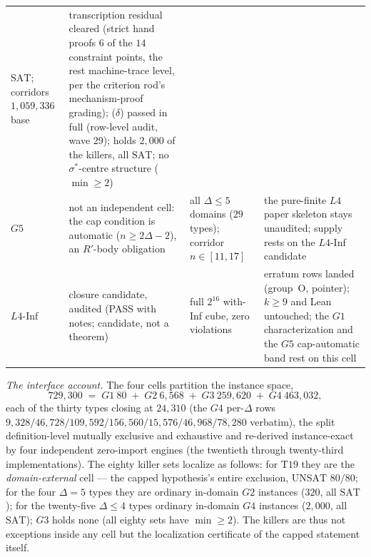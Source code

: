 \begin{table}[ht]
\begin{tabular}{p{0.9cm} p{4.0cm} p{2.3cm} p{6.3cm}}
  $\mathrm{SAT}$; corridors $1{,}059{,}336$ base & transcription residual
  cleared (strict hand proofs $6$ of the $14$ constraint points, the rest
  machine-trace level, per the criterion rod's mechanism-proof grading);
  ($\delta$) passed in full (row-level audit, wave 29); holds $2{,}000$ of
  the killers, all $\mathrm{SAT}$; no $\sigma^\ast$-centre
  structure ($\min\ge2$) \\
$G5$ & not an independent cell: the cap condition is automatic
  ($n\ge2\Delta-2$), an $R'$-body obligation & all $\Delta\le5$ domains
  ($29$ types); corridor $n\in[11,17]$ & the pure-finite $L4$ paper skeleton
  stays unaudited; supply rests on the $L4$-Inf candidate \\
$L4$-Inf & closure candidate, audited (PASS with notes; candidate, not a
  theorem) & full $2^{16}$ with-Inf cube, zero violations & erratum rows
  landed (group~O, pointer); $k\ge9$ and Lean untouched; the $G1$
  characterization and the $G5$ cap-automatic band rest on this cell \\
\hline
\end{tabular}
\end{table}

\emph{The interface account.} The four cells partition the instance space,
\[
729{,}300 \;=\; G1\ 80 \;+\; G2\ 6{,}568 \;+\; G3\ 259{,}620 \;+\; G4\ 463{,}032,
\]
each of the thirty types closing at $24{,}310$ (the $G4$ per-$\Delta$ rows
$9{,}328/\allowbreak46{,}728/\allowbreak109{,}592/\allowbreak156{,}560/\allowbreak15{,}576/\allowbreak46{,}968/\allowbreak78{,}280$
verbatim),
the split definition-level mutually exclusive and exhaustive and re-derived
instance-exact by four independent zero-import engines (the twentieth through
twenty-third implementations). The eighty killer sets localize as follows:
for $\mathrm{T19}$ they are the \emph{domain-external} cell --- the capped
hypothesis's entire exclusion, $\mathrm{UNSAT}$ $80/80$; for the four
$\Delta=5$ types they are ordinary in-domain $G2$ instances ($320$, all
$\mathrm{SAT}$); for the twenty-five $\Delta\le4$ types ordinary in-domain
$G4$ instances ($2{,}000$, all $\mathrm{SAT}$); $G3$ holds none (all eighty
sets have $\min\ge2$). The killers are thus not exceptions inside any cell
but the localization certificate of the capped statement itself.

